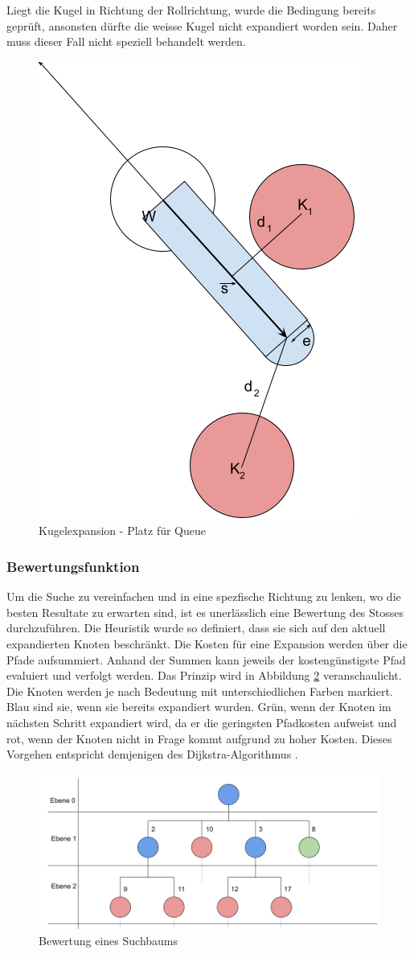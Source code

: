 Liegt die Kugel in Richtung der Rollrichtung, wurde die Bedingung bereits geprüft, ansonsten dürfte die weisse Kugel nicht
expandiert worden sein. Daher muss dieser Fall nicht speziell behandelt werden.

\begin{figure}[h!]
    \begin{center}
        \includegraphics[width=0.3\linewidth]{../common/03_billiard_ai/resources/37_platz_fuer_queue.png}
    \end{center}
    \caption{Kugelexpansion - Platz für Queue}
    \label{fig:kugelexpansion_platz_fuer_queue}
\end{figure}

\newpage
\subsubsection{Bewertungsfunktion}
Um die Suche zu vereinfachen und in eine spezfische Richtung zu lenken, wo die besten Resultate zu erwarten sind, ist
es unerlässlich eine Bewertung des Stosses durchzuführen. Die Heuristik wurde so definiert, dass sie sich auf den
aktuell expandierten Knoten beschränkt. Die Kosten für eine Expansion werden über die Pfade aufsummiert. Anhand der
Summen kann jeweils der kostengünstigste Pfad evaluiert und verfolgt werden.
Das Prinzip wird in Abbildung \ref{fig:suchbaum_bewertung} veranschaulicht. Die Knoten werden je nach Bedeutung mit
unterschiedlichen Farben markiert. Blau sind sie, wenn sie bereits expandiert wurden. Grün, wenn der Knoten im nächsten
Schritt expandiert wird, da er die geringsten Pfadkosten aufweist und rot, wenn der Knoten nicht in Frage kommt aufgrund
zu hoher Kosten. Dieses Vorgehen entspricht demjenigen des Dijkstra-Algorithmus \cite{wiki.dijkstra:1}.
\begin{figure}[h!]
    \begin{center}
        \includegraphics[width=0.8\linewidth]{../common/03_billiard_ai/resources/28_suchbaum_bewertung.png}
    \end{center}
    \caption{Bewertung eines Suchbaums}
    \label{fig:suchbaum_bewertung}
\end{figure}

